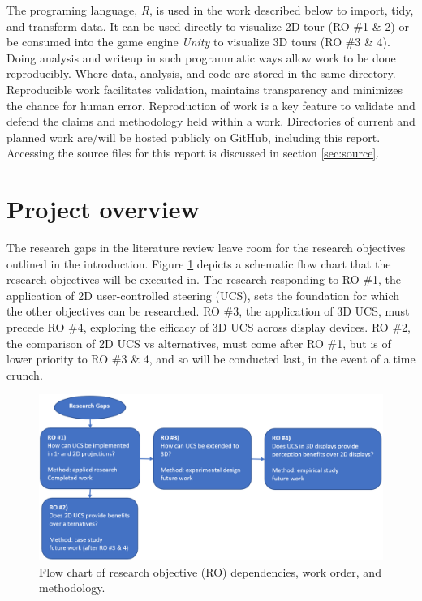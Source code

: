 \documentclass{monashthesis}
\begin{document}
The programing language, \emph{R}, is used in the work described below
to import, tidy, and transform data. It can be used directly to
visualize 2D tour (RO \#1 \& 2) or be consumed into the game engine
\emph{Unity} to visualize 3D tours (RO \#3 \& 4). Doing analysis and
writeup in such programmatic ways allow work to be done reproducibly.
Where data, analysis, and code are stored in the same directory.
Reproducible work facilitates validation, maintains transparency and
minimizes the chance for human error. Reproduction of work is a key
feature to validate and defend the claims and methodology held within a
work. Directories of current and planned work are/will be hosted
publicly on GitHub, including this report. Accessing the source files
for this report is discussed in section \ref{sec:source}.

\section{Project overview}\label{ch:projectoverview}

The research gaps in the literature review leave room for the research
objectives outlined in the introduction. Figure
\ref{fig:ProjectOverview} depicts a schematic flow chart that the
research objectives will be executed in. The research responding to RO
\#1, the application of 2D user-controlled steering (UCS), sets the
foundation for which the other objectives can be researched. RO \#3, the
application of 3D UCS, must precede RO \#4, exploring the efficacy of 3D
UCS across display devices. RO \#2, the comparison of 2D UCS vs
alternatives, must come after RO \#1, but is of lower priority to RO \#3
\& 4, and so will be conducted last, in the event of a time crunch.




\begin{figure}

{\centering \includegraphics[width=1\linewidth]{./figures/ProjectOverview} 

}

\caption{Flow chart of research objective (RO)
dependencies, work order, and methodology.}\label{fig:ProjectOverview}
\end{figure}
\end{document}
